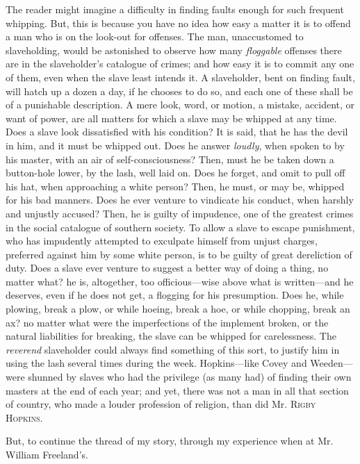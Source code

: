 The reader might imagine a difficulty in finding faults enough for such
frequent whipping. But, this {}is because you have no idea how easy a
matter it is to offend a man who is on the look-out for offenses. The
man, unaccustomed to slaveholding, would be astonished to observe how
many \emph{floggable} offenses there are in the slaveholder's catalogue
of crimes; and how easy it is to commit any one of them, even when the
slave least intends it. A slaveholder, bent on finding fault, will hatch
up a dozen a day, if he chooses to do so, and each one of these shall be
of a punishable description. A mere look, word, or motion, a mistake,
accident, or want of power, are all matters for which a slave may be
whipped at any time. Does a slave look dissatisfied with his condition?
It is said, that he has the devil in him, and it must be whipped out.
Does he answer \emph{loudly}, when spoken to by his master, with an air
of self-consciousness? Then, must he be taken down a button-hole lower,
by the lash, well laid on. Does he forget, and omit to pull off his hat,
when approaching a white person? Then, he must, or may be, whipped for
his bad manners. Does he ever venture to vindicate his conduct, when
harshly and unjustly accused? Then, he is guilty of impudence, one of
the greatest crimes in the social catalogue of southern society. To
allow a slave to escape punishment, who has impudently attempted to
exculpate himself from unjust charges, preferred against him by some
white person, is to be guilty of great dereliction of duty. Does a slave
ever venture to suggest a better way of doing a thing, no matter what?
he is, altogether, too officious---wise above what is written---and he
deserves, even if he does not get, a flogging for his presumption. Does
he, while {}plowing, break a plow, or while hoeing, break a hoe, or
while chopping, break an ax? no matter what were the imperfections of
the implement broken, or the natural liabilities for breaking, the slave
can be whipped for carelessness. The \emph{reverend} slaveholder could
always find something of this sort, to justify him in using the lash
several times during the week. Hopkins---like Covey and Weeden---were
shunned by slaves who had the privilege (as many had) of finding their
own masters at the end of each year; and yet, there was not a man in all
that section of country, who made a louder profession of religion, than
did Mr. \textsc{Rigby Hopkins}.

But, to continue the thread of my story, through my experience when at
Mr. William Freeland's.

